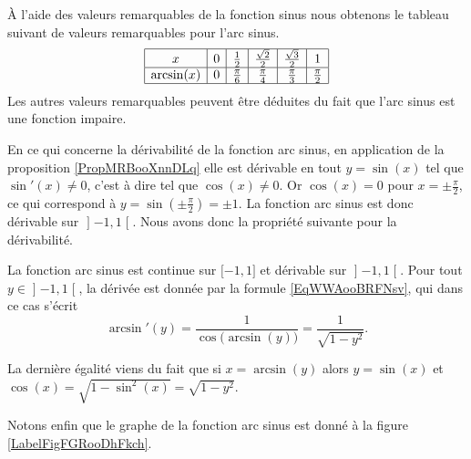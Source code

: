 À l'aide des valeurs remarquables de la fonction sinus nous obtenons le tableau suivant de valeurs remarquables pour l'arc sinus.
\begin{equation*}
    \begin{array}[]{|c|c|c|c|c|c|}
        \hline
        x&0&\frac{ 1 }{2}&\frac{ \sqrt{2} }{2}&\frac{ \sqrt{3} }{2}&1\\
          \hline
          \arcsin(x)&0&\frac{ \pi }{ 6 }&\frac{ \pi }{ 4 }&\frac{ \pi }{ 3 }&\frac{ \pi }{ 2 }\\ 
          \hline 
           \end{array}
\end{equation*}
Les autres valeurs remarquables peuvent être déduites du fait que l'arc sinus est une fonction impaire.

En ce qui concerne la dérivabilité de la fonction arc sinus, en application de la proposition \ref{PropMRBooXnnDLq} elle est dérivable en tout \( y=\sin(x)\) tel que \( \sin'(x)\neq 0\), c'est à dire tel que \( \cos(x)\neq 0\). Or \( \cos(x)=0\) pour \( x=\pm\frac{ \pi }{2}\), ce qui correspond à \( y=\sin(\pm\frac{ \pi }{2})=\pm 1\). La fonction arc sinus est donc dérivable sur \( \mathopen] -1 , 1 \mathclose[\). Nous avons donc la propriété suivante pour la dérivabilité.

\begin{proposition}
    La fonction arc sinus est continue sur \( \mathopen[ -1 , 1 \mathclose]\) et dérivable sur \( \mathopen] -1 , 1 \mathclose[\). Pour tout \( y\in\mathopen] -1 , 1 \mathclose[\), la dérivée est donnée par la formule \eqref{EqWWAooBRFNsv}, qui dans ce cas s'écrit
        \begin{equation}
            \arcsin'(y)=\frac{1}{ \cos\big( \arcsin(y) \big) }=\frac{1}{ \sqrt{1-y^2} }.
        \end{equation}
\end{proposition}
La dernière égalité viens du fait que si $x=\arcsin(y)$ alors $y = \sin(x)$ et $\cos(x)= \sqrt{1-\sin^2(x)} = \sqrt{1-y^2}$. 

%    

Notons enfin que le graphe de la fonction arc sinus est donné à la figure \ref{LabelFigFGRooDhFkch}. %
\newcommand{\CaptionFigFGRooDhFkch}{Le graphe de la fonction \( x\mapsto \arcsin(x)\)}


